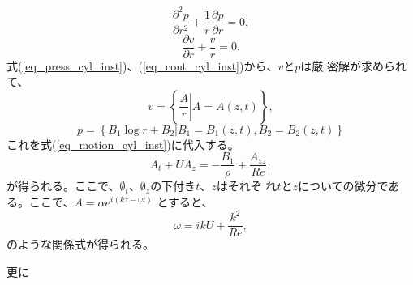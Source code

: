 \begin{equation}
 \frac{\partial^2 p}{\partial r^2} 
  + \frac{1}{r}\frac{\partial p}{\partial r} = 0, \label{eq_press_cyl_inst}
\end{equation}
\begin{equation}
 \frac{\partial v}{\partial r}+\frac{v}{r} = 0. \label{eq_cont_cyl_inst}
\end{equation}
式(\ref{eq_press_cyl_inst})、(\ref{eq_cont_cyl_inst})から、$v$と$p$は厳
密解が求められて、
\begin{equation}
 v = \left\{\left.\frac{A}{r}\right|A=A(z,t)\right\},
\end{equation}
\begin{equation}
 p = \left\{B_1\log r + B_2|B_1 = B_1 (z, t), B_2 = B_2 (z, t)\right\}
\end{equation}
これを式(\ref{eq_motion_cyl_inst})に代入する。
\begin{equation}
 A_t + U A_z = -\frac{B_1}{\rho}+\frac{A_{zz}}{Re},
\end{equation}
が得られる。ここで、$\emptyset_t$、$\emptyset_z$の下付き$t$、$z$はそれぞ
れ$t$と$z$についての微分である。ここで、$A=\alpha e^{i(kz - \omega t)}$
とすると、
\begin{equation}
 \omega = ikU + \frac{k^2}{Re},
\end{equation}
のような関係式が得られる。

更に
